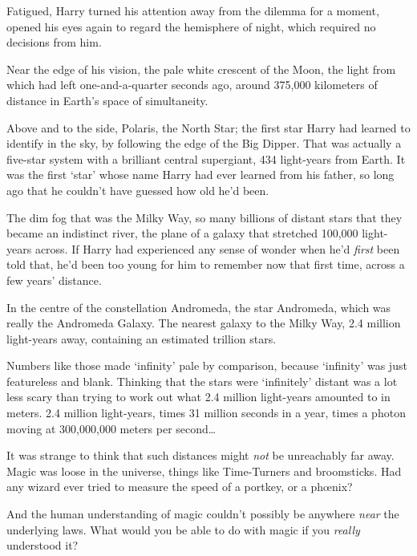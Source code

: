 Fatigued, Harry turned his attention away from the dilemma for a moment, opened his eyes again to regard the hemisphere of night, which required no decisions from him.

Near the edge of his vision, the pale white crescent of the Moon, the light from which had left one-and-a-quarter seconds ago, around 375,000 kilometers of distance in Earth's space of simultaneity.

Above and to the side, Polaris, the North Star; the first star Harry had learned to identify in the sky, by following the edge of the Big Dipper. That was actually a five-star system with a brilliant central supergiant, 434 light-years from Earth. It was the first `star' whose name Harry had ever learned from his father, so long ago that he couldn't have guessed how old he'd been.

The dim fog that was the Milky Way, so many billions of distant stars that they became an indistinct river, the plane of a galaxy that stretched 100,000 light-years across. If Harry had experienced any sense of wonder when he'd \emph{first} been told that, he'd been too young for him to remember now that first time, across a few years' distance.

In the centre of the constellation Andromeda, the star Andromeda, which was really the Andromeda Galaxy. The nearest galaxy to the Milky Way, 2.4 million light-years away, containing an estimated trillion stars.

Numbers like those made `infinity' pale by comparison, because `infinity' was just featureless and blank. Thinking that the stars were `infinitely' distant was a lot less scary than trying to work out what 2.4 million light-years amounted to in meters. 2.4 million light-years, times 31 million seconds in a year, times a photon moving at 300,000,000 meters per second{\ldots}

It was strange to think that such distances might \emph{not} be unreachably far away. Magic was loose in the universe, things like Time-Turners and broomsticks. Had any wizard ever tried to measure the speed of a portkey, or a phœnix?

And the human understanding of magic couldn't possibly be anywhere \emph{near} the underlying laws. What would you be able to do with magic if you \emph{really} understood it?

